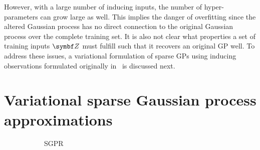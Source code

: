 However, with a large number of inducing inputs, the number of hyper-parameters can grow large as well.
This implies the danger of overfitting since the altered Gaussian process has no direct connection to the original Gaussian process over the complete training set.
It is also not clear what properties a set of training inputs $\mat{Z}$ must fulfill such that it recovers an original GP well.
To address these issues, a variational formulation of sparse GPs using inducing observations formulated originally in~\parencite{titsias_variational_2009,hensman_gaussian_2013} is discussed next.

\section{Variational sparse Gaussian process approximations}
\begin{figure}[t]
    \begin{subfigure}[b]{\halffigurewidth}
        \centering
        \caption{
            SGPR
            \label{fig:gp:sparse_graphical_model:sgrp}
        }
    \end{subfigure}
    \hfill
    \begin{subfigure}[b]{\halffigurewidth}
        \centering
\end{subfigure}
\end{figure}

